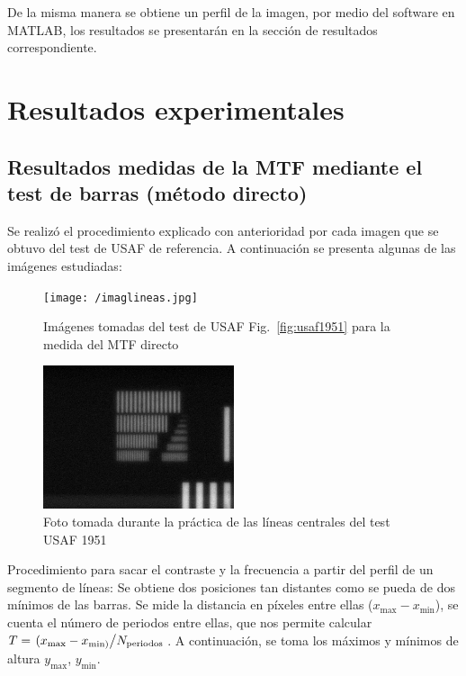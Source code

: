 \documentclass{./packages/optica-article}
\begin{document}
De la misma manera se obtiene un perfil de la imagen, por medio del software en MATLAB, los resultados se presentarán en la sección de resultados correspondiente.


\section{Resultados experimentales}\label{sec:resultados}

\subsection{Resultados medidas de la MTF mediante el test de barras (método directo)}\label{sec:mtf-directo}
Se realizó el procedimiento explicado con anterioridad por cada imagen que se obtuvo del test de USAF de referencia. A continuación se presenta algunas de las imágenes estudiadas:

\begin{figure}[!h]
	\texttt{[image: /imaglineas.jpg]}
	\caption{Imágenes tomadas del test de USAF Fig.~\ref{fig:usaf1951} para la medida del MTF directo}\label{fig:images:example}
\end{figure}

\begin{figure}[!h]
	\centering
	\includegraphics[width=0.5\textwidth]{smallest_lines}
	\caption{Foto tomada durante la práctica de las líneas centrales del test USAF 1951}\label{fig:usafpic}
\end{figure}

Procedimiento para sacar el contraste y la frecuencia a partir del perfil de un segmento de líneas: Se obtiene dos posiciones tan distantes como se pueda de dos mínimos de las barras. Se mide la distancia en píxeles entre ellas ($x_{\max} - x_{\min} $), se cuenta el número de periodos entre ellas, que nos permite calcular $T = \flatfrac{(x_{\max} - x_{\min)} }{N_{\textrm{periodos}}}$. A continuación,  se toma los máximos y mínimos de altura $y_{\max}$, $y_{\min}$.
\end{document}
